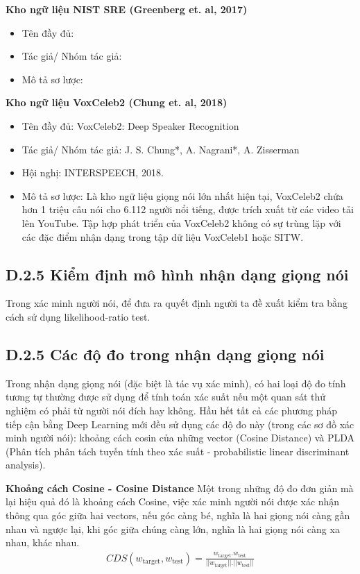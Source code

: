 \documentclass{article}
\begin{document}
	\textbf{Kho ngữ liệu NIST SRE (Greenberg et. al, 2017)}
	\begin{itemize}
		\item Tên đầy đủ:
		\item Tác giả/ Nhóm tác giả: 
		\item Mô tả sơ lược:
	\end{itemize}
	\textbf{Kho ngữ liệu VoxCeleb2 (Chung et. al, 2018)}
	\begin{itemize}
		\item Tên đầy đủ: VoxCeleb2: Deep Speaker Recognition  
		\item Tác giả/ Nhóm tác giả: J. S. Chung*, A. Nagrani*, A. Zisserman
		\item Hội nghị: INTERSPEECH, 2018.  
		\item Mô tả sơ lược: Là kho ngữ liệu giọng nói lớn nhất hiện tại, VoxCeleb2 chứa hơn 1 triệu câu nói cho 6.112 người nổi tiếng, được trích xuất từ các video tải lên YouTube. Tập hợp phát triển của VoxCeleb2 không có sự trùng lặp với các đặc điểm nhận dạng trong tập dữ liệu VoxCeleb1 hoặc SITW.
	\end{itemize}
	\subsection{D.2.5 Kiểm định mô hình nhận dạng giọng nói}
	Trong xác minh người nói, để đưa ra quyết định người ta đề xuất kiểm tra bằng cách sử dụng likelihood-ratio test.

	\subsection{D.2.5 Các độ đo trong nhận dạng giọng nói}
	
	Trong nhận dạng giọng nói (đặc biệt là tác vụ xác minh), có hai loại độ đo tính tương tự thường được sử dụng để tính toán xác suất nếu một quan sát thử nghiệm có phải từ người nói đích hay không. Hầu hết tất cả các phương pháp tiếp cận bằng Deep Learning mới đều sử dụng các độ đo này (trong các sơ đồ xác minh người nói): khoảng cách cosin của những vector (Cosine Distance) và PLDA (Phân tích phân tách tuyến tính theo xác suất - probabilistic linear discriminant analysis).
	
	\textbf{Khoảng cách Cosine - Cosine Distance}
	Một trong những độ đo đơn giản mà lại hiệu quả đó là khoảng cách Cosine, việc xác minh người nói được xác nhận thông qua góc giữa hai vectors, nếu góc càng bé, nghĩa là hai giọng nói càng gần nhau và ngược lại, khi góc giữa chúng càng lớn, nghĩa là hai giọng nói càng xa nhau, khác nhau.
	\begin{align*}
		CDS(w_{\text{target}}, w_{\text{test}}) = \frac{w_{\text{target}}.w_{\text{test}}}{||w_{\text{target}}||.||w_{\text{test}}||}
	\end{align*}
	
\end{document}
